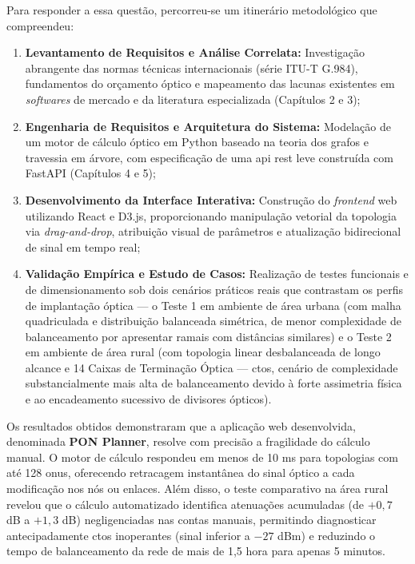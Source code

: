 Para responder a essa questão, percorreu-se um itinerário metodológico que compreendeu:
\begin{enumerate}
    \item \textbf{Levantamento de Requisitos e Análise Correlata:} Investigação abrangente das normas técnicas internacionais (série ITU-T G.984), fundamentos do orçamento óptico e mapeamento das lacunas existentes em \textit{softwares} de mercado e da literatura especializada (Capítulos 2 e 3);
    \item \textbf{Engenharia de Requisitos e Arquitetura do Sistema:} Modelação de um motor de cálculo óptico em Python baseado na teoria dos grafos e travessia em árvore, com especificação de uma \gls{api} \gls{rest} leve construída com FastAPI (Capítulos 4 e 5);
    \item \textbf{Desenvolvimento da Interface Interativa:} Construção do \textit{frontend} web utilizando React e D3.js, proporcionando manipulação vetorial da topologia via \textit{drag-and-drop}, atribuição visual de parâmetros e atualização bidirecional de sinal em tempo real;
    \item \textbf{Validação Empírica e Estudo de Casos:} Realização de testes funcionais e de dimensionamento sob dois cenários práticos reais que contrastam os perfis de implantação óptica — o Teste 1 em ambiente de área urbana (com malha quadriculada e distribuição balanceada simétrica, de menor complexidade de balanceamento por apresentar ramais com distâncias similares) e o Teste 2 em ambiente de área rural (com topologia linear desbalanceada de longo alcance e 14 Caixas de Terminação Óptica — \glspl{cto}, cenário de complexidade substancialmente mais alta de balanceamento devido à forte assimetria física e ao encadeamento sucessivo de divisores ópticos).
\end{enumerate}

Os resultados obtidos demonstraram que a aplicação web desenvolvida, denominada \textbf{PON Planner}, resolve com precisão a fragilidade do cálculo manual. O motor de cálculo respondeu em menos de 10 ms para topologias com até 128 \glspl{onu}, oferecendo retracagem instantânea do sinal óptico a cada modificação nos nós ou enlaces. Além disso, o teste comparativo na área rural revelou que o cálculo automatizado identifica atenuações acumuladas (de $+0,7$ dB a $+1,3$ dB) negligenciadas nas contas manuais, permitindo diagnosticar antecipadamente \glspl{cto} inoperantes (sinal inferior a $-27$ dBm) e reduzindo o tempo de balanceamento da rede de mais de 1,5 hora para apenas 5 minutos.

